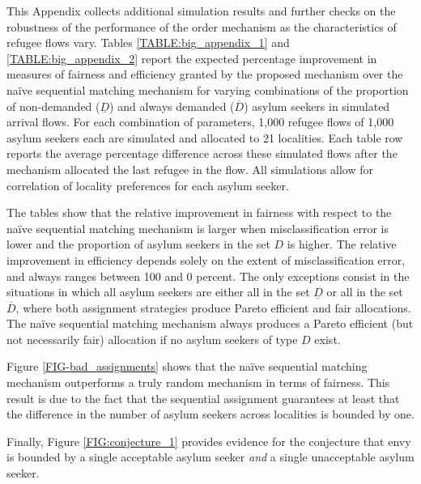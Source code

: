 \documentclass[12pt,fleqn]{article}
\begin{document}
This Appendix collects additional simulation results and further checks on the robustness of the performance of the order mechanism as the characteristics of refugee flows vary. Tables \ref{TABLE:big_appendix_1} and \ref{TABLE:big_appendix_2} report the expected percentage improvement in measures of fairness and efficiency granted by the proposed mechanism over the na\"{i}ve sequential matching mechanism for varying combinations of the proportion of non-demanded ($\underline{D}$) and always demanded ($\overline{D}$) asylum seekers in simulated arrival flows. For each combination of parameters, 1,000 refugee flows of 1,000 asylum seekers each are simulated and allocated to 21 localities. Each table row reports the average percentage difference across these simulated flows after the mechanism allocated the last refugee in the flow. All simulations allow for correlation of locality preferences for each asylum seeker.

The tables show that the relative improvement in fairness with respect to the na\"{i}ve sequential matching mechanism is larger when misclassification error is lower and the proportion of asylum seekers in the set $D$ is higher. The relative improvement in efficiency depends solely on the extent of misclassification error, and always ranges between 100 and 0 percent. The only exceptions consist in the situations in which all asylum seekers are either all in the set $\underline{D}$ or all in the set $\overline{D}$, where both assignment strategies produce Pareto efficient and fair allocations. The na\"{i}ve sequential matching mechanism always produces a Pareto efficient (but not necessarily fair) allocation if no asylum seekers of type $D$ exist.

Figure \ref{FIG-bad_assignments} shows that the na\"{i}ve sequential matching mechanism outperforms a truly random mechanism in terms of fairness. This result is due to the fact that the sequential assignment guarantees at least that the difference in the number of asylum seekers across localities is bounded by one.

Finally, Figure \ref{FIG:conjecture_1} provides evidence for the conjecture that envy is bounded by a single acceptable asylum seeker \emph{and} a single unacceptable asylum seeker.
\end{document}
